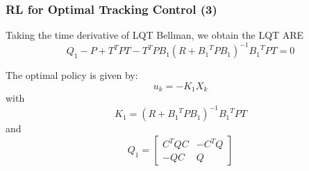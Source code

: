 \documentclass{beamer}
\begin{document}
			\begin{frame}\frametitle{RL for Optimal Tracking Control (3)}
				\fontsize{8}{4}\selectfont
				Taking the time derivative of LQT Bellman, we obtain the LQT ARE
				\begin{equation}
				Q_1 - P + T^TPT - T^TPB_1(R+{B_1}^TPB_1)^{-1}{B_1}^TPT = 0
				\end{equation}
				
				The optimal policy is given by:
				\begin{equation}
				u_k = -K_1X_k
				\end{equation}
				with
				\begin{equation}
				K_1 = (R+{B_1}^TPB_1)^{-1}{B_1}^TPT
				\end{equation}	
				and 
				\begin{equation}
				Q_1 = \left[ \begin{array}{cc}
				C^TQC & -C^TQ \\ 
				-QC & Q
				\end{array} \right] 
				\end{equation}
				
			\end{frame}
			
\end{document}
